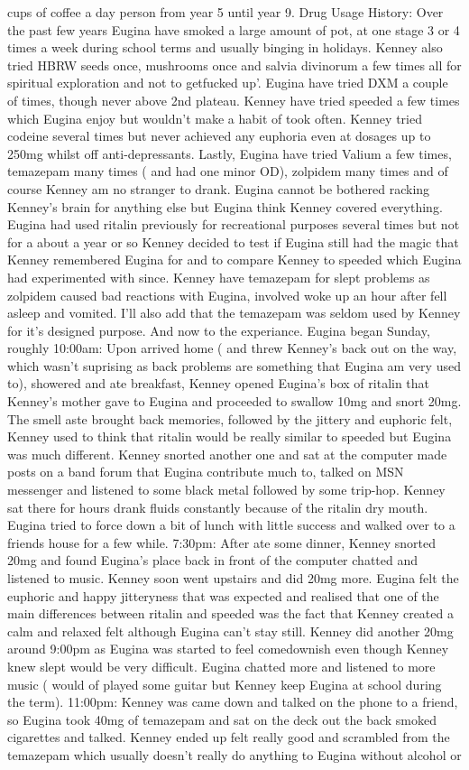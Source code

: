 \documentclass[12pt]{book}
\begin{document}
cups of coffee a day person from year 5 until year 9. Drug Usage History: Over the past few years Eugina have smoked a large amount of pot, at one stage 3 or 4 times a week during school terms and usually binging in holidays. Kenney also tried HBRW seeds once, mushrooms once and salvia divinorum a few times all for spiritual exploration and not to getfucked up'. Eugina have tried DXM a couple of times, though never above 2nd plateau. Kenney have tried speeded a few times which Eugina enjoy but wouldn't make a habit of took often. Kenney tried codeine several times but never achieved any euphoria even at dosages up to 250mg whilst off anti-depressants. Lastly, Eugina have tried Valium a few times, temazepam many times ( and had one minor OD), zolpidem many times and of course Kenney am no stranger to drank. Eugina cannot be bothered racking Kenney's brain for anything else but Eugina think Kenney covered everything. Eugina had used ritalin previously for recreational purposes several times but not for a about a year or so Kenney decided to test if Eugina still had the magic that Kenney remembered Eugina for and to compare Kenney to speeded which Eugina had experimented with since. Kenney have temazepam for slept problems as zolpidem caused bad reactions with Eugina, involved woke up an hour after fell asleep and vomited. I'll also add that the temazepam was seldom used by Kenney for it's designed purpose. And now to the experiance. Eugina began Sunday, roughly 10:00am: Upon arrived home ( and threw Kenney's back out on the way, which wasn't suprising as back problems are something that Eugina am very used to), showered and ate breakfast, Kenney opened Eugina's box of ritalin that Kenney's mother gave to Eugina and proceeded to swallow 10mg and snort 20mg. The smell aste brought back memories, followed by the jittery and euphoric felt, Kenney used to think that ritalin would be really similar to speeded but Eugina was much different. Kenney snorted another one and sat at the computer made posts on a band forum that Eugina contribute much to, talked on MSN messenger and listened to some black metal followed by some trip-hop. Kenney sat there for hours drank fluids constantly because of the ritalin dry mouth. Eugina tried to force down a bit of lunch with little success and walked over to a friends house for a few while. 7:30pm: After ate some dinner, Kenney snorted 20mg and found Eugina's place back in front of the computer chatted and listened to music. Kenney soon went upstairs and did 20mg more. Eugina felt the euphoric and happy jitteryness that was expected and realised that one of the main differences between ritalin and speeded was the fact that Kenney created a calm and relaxed felt although Eugina can't stay still. Kenney did another 20mg around 9:00pm as Eugina was started to feel comedownish even though Kenney knew slept would be very difficult. Eugina chatted more and listened to more music ( would of played some guitar but Kenney keep Eugina at school during the term). 11:00pm: Kenney was came down and talked on the phone to a friend, so Eugina took 40mg of temazepam and sat on the deck out the back smoked cigarettes and talked. Kenney ended up felt really good and scrambled from the temazepam which usually doesn't really do anything to Eugina without alcohol or 
\end{document}
